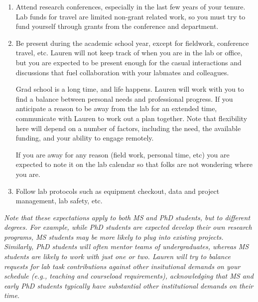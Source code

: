 \documentclass[12pt]{article}
\begin{document}
\begin{enumerate}
\item Attend research conferences, especially in the last few years of
  your tenure. Lab funds for travel are limited non-grant related work, so you must try to
  fund yourself through grants from the conference and department.
  
\item Be present during the academic school year, except for fieldwork, conference travel, etc. Lauren will not keep track of when you are in the lab or office, but you are expected to be present enough for the casual interactions and discussions that fuel collaboration with your labmates and colleagues.  

Grad school is a long time, and life happens. Lauren will work with you to find a balance between personal needs and professional progress. If you anticipate a reason to be away from the lab for an extended time, communicate with Lauren to work out a plan together. Note that flexibility here will depend on a number of factors, including the need, the available funding, and your ability to engage remotely.
  
If you are away for any reason (field work, personal time, etc) you are expected to note it on the lab calendar so that folks are not wondering where you are. 

\item Follow lab protocols such as equipment checkout, data and project management, lab safety, etc.

\end{enumerate}

\textit{Note that these expectations apply to both MS and PhD students, but to different degrees. For example, while PhD students are expected develop their own research programs, MS students may be more likely to plug into existing projects. Similarly, PhD students will often mentor teams of undergraduates, whereas MS students are likely to work with just one or two. Lauren will try to balance requests for lab task contributions against other insitutional demands on your schedule (e.g., teaching and courseload requirements), acknowledging that MS and early PhD students typically have substantial other institutional demands on their time.}
\end{document}

